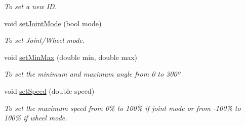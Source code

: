 \begin{DoxyCompactItemize}
\begin{DoxyCompactList}\small\item\em To set a new I\+D. \end{DoxyCompactList}\item 
void \hyperlink{a00001_ac48405a5f4aa73c1f2d56f633dfbec50}{set\+Joint\+Mode} (bool mode)
\begin{DoxyCompactList}\small\item\em To set Joint/\+Wheel mode. \end{DoxyCompactList}\item 
void \hyperlink{a00001_a914864d133f8cbaf95594747aaff55f2}{set\+Min\+Max} (double min, double max)
\begin{DoxyCompactList}\small\item\em To set the minimum and maximum angle from 0 to 300º \end{DoxyCompactList}\item 
void \hyperlink{a00001_a95428eea4d5165b81d80e4ab38e33b7b}{set\+Speed} (double speed)
\begin{DoxyCompactList}\small\item\em To set the maximum speed from 0\% to 100\% if joint mode or from -\/100\% to 100\% if wheel mode. \end{DoxyCompactList}\end{DoxyCompactItemize}
